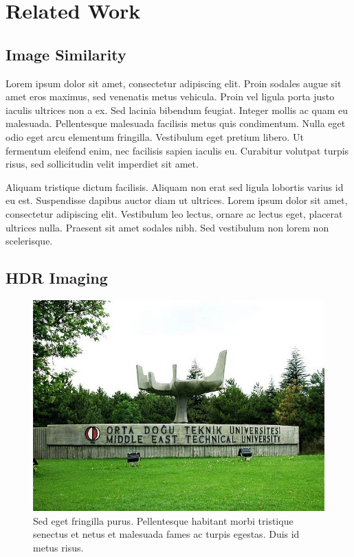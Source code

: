 \chapter{Related Work}
\label{chp:b2}

\section{Image Similarity}
Lorem ipsum dolor sit amet, consectetur adipiscing elit. Proin sodales augue sit amet eros maximus, sed venenatis metus vehicula. Proin vel ligula porta justo iaculis ultrices non a ex. Sed lacinia bibendum feugiat. Integer mollis ac quam eu malesuada. Pellentesque malesuada facilisis metus quis condimentum. Nulla eget odio eget arcu elementum fringilla. Vestibulum eget pretium libero. Ut fermentum eleifend enim, nec facilisis sapien iaculis eu. Curabitur volutpat turpis risus, sed sollicitudin velit imperdiet sit amet.

Aliquam tristique dictum facilisis. Aliquam non erat sed ligula lobortis varius id eu est. Suspendisse dapibus auctor diam ut ultrices. Lorem ipsum dolor sit amet, consectetur adipiscing elit. Vestibulum leo lectus, ornare ac lectus eget, placerat ultrices nulla. Praesent sit amet sodales nibh. Sed vestibulum non lorem non scelerisque. 

\section{HDR Imaging}

\begin{figure}[h]
\centering
\includegraphics[width=.8\textwidth]{figures/bilim_agaci.jpg}
\caption{Sed eget fringilla purus. Pellentesque habitant morbi tristique senectus et netus et malesuada fames ac turpis egestas. Duis id metus risus. }
\label{fig:sample}
\end{figure}

